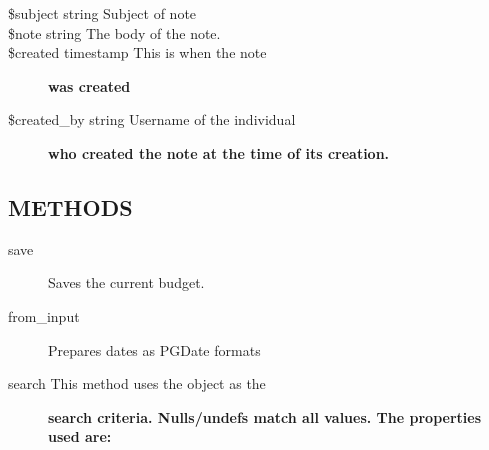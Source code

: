 \begin{description}
\begin{description}
\begin{description}
\begin{description}
\begin{description}
\begin{description}
\begin{description}
\begin{description}
\begin{description}
\begin{description}
\begin{description}

\item[{\$subject string
   Subject of note}] \mbox{}
\item[{\$note string
   The body of the note.}] \mbox{}
\item[{\$created timestamp This is when the note}] \textbf{was created}
\item[{\$created\_by string Username of the individual}] \textbf{who created the note at the time of its creation.}\end{description}
\subsection*{METHODS\label{LedgerSMB::DBObject::Budget_METHODS}}
\begin{description}

\item[{save}] \mbox{}

Saves the current budget.


\item[{from\_input}] \mbox{}

Prepares dates as PGDate formats


\item[{search This method uses the object as the}] \textbf{search criteria. Nulls/undefs match all values. The properties used are:}\begin{description}


\end{description}
\end{description}
\end{description}
\end{description}
\end{description}
\end{description}
\end{description}
\end{description}
\end{description}
\end{description}
\end{description}
\end{description}
